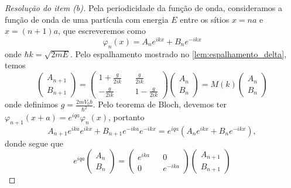 \begin{proof}[Resolução do item (b)]
    Pela periodicidade da função de onda, consideramos a função de onda de uma partícula com energia \(E\) entre os sítios \(x = na\) e \(x = (n+1)a\), que escreveremos como
    \begin{equation*}
        \varphi_n(x) = A_n e^{ikx} + B_n e^{-ikx}
    \end{equation*}
    onde \(\hbar k = \sqrt{2m E}\). Pelo espalhamento mostrado no \cref{lem:espalhamento_delta}, temos
    \begin{equation*}
        \begin{pmatrix}
            A_{n+1}\\
            B_{n+1}
        \end{pmatrix} =
        \begin{pmatrix}
            1 + \frac{g}{2ik} && \frac{g}{2ik}\\
            -\frac{g}{2ik} && 1-\frac{g}{2ik}
        \end{pmatrix}
        \begin{pmatrix}
            A_n\\
            B_n
        \end{pmatrix}
        = M(k)
        \begin{pmatrix}
            A_n\\
            B_n
        \end{pmatrix}
    \end{equation*}
    onde definimos \(g = \frac{2m V_0 b}{\hbar^2}\). Pelo teorema de Bloch, devemos ter \(\varphi_{n+1}(x+a) = e^{iqa}\varphi_{n}(x)\), portanto
    \begin{equation*}
        A_{n+1} e^{ika} e^{ikx} + B_{n+1} e^{-ika} e^{-ikx} = e^{iqa}(A_n  e^{ikx} + B_n e^{-ikx}),
    \end{equation*}
    donde segue que
    \begin{equation*}
        e^{iqa}
        \begin{pmatrix}
            A_{n}\\
            B_{n}
        \end{pmatrix} =
        \begin{pmatrix}
            e^{ika} && 0\\
            0 && e^{-ika}
        \end{pmatrix}
        \begin{pmatrix}
            A_{n+1}\\
            B_{n+1}
        \end{pmatrix}

\end{equation*}
\end{proof}
